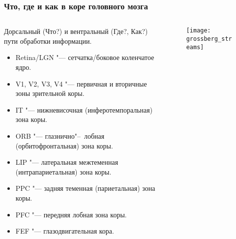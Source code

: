 \documentclass[default]{beamer}
\begin{document}
	\begin{frame}
		\frametitle{Что, где и как в коре головного мозга}
		
		\begin{columns}
			\begin{column}{0.6\textwidth}
				\footnotesize
				Дорсальный (Что?) и вентральный (Где?, Как?) пути обработки информации.
				\begin{itemize}
					\item Retina/LGN "--- сетчатка/боковое коленчатое ядро.
					\item V1, V2, V3, V4 "--- первичная и вторичные зоны зрительной коры.
					\item IT "--- нижневисочная (инферотемпоральная) зона коры.
					\item ORB "--- глазнично"--~лобная (орбитофронтальная) зона коры.
					\item LIP "--- латеральная межтеменная (интрапариетальная) зона коры.
					\item PPC "--- задняя теменная (париетальная) зона коры.
					\item PFC "--- передняя лобная зона коры.
					\item FEF "--- глазодвигательная кора.
				\end{itemize}
			\end{column}
			\begin{column}{0.4\textwidth}
				\vspace*{-5mm}
				\begin{figure}
					\texttt{[image: grossberg\_streams]}
				\end{figure}
				
			\end{column}
		\end{columns}
	\end{frame}
\end{document}
